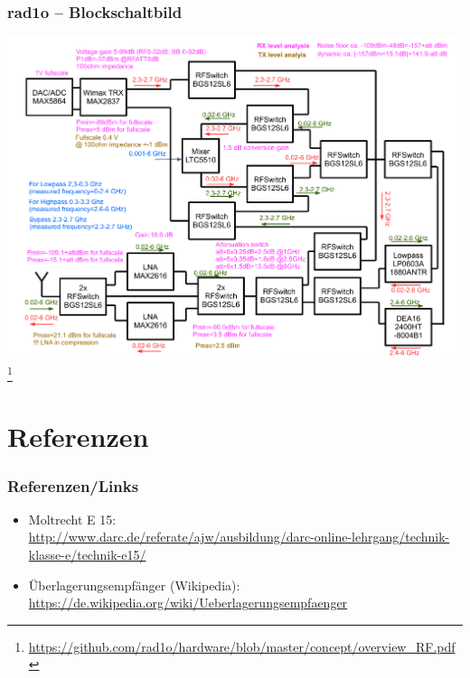 \begin{frame}
  \frametitle{rad1o -- Blockschaltbild}
  \begin{center}
    \includegraphics[width=1\textwidth,height=.8\textheight,keepaspectratio]{e15/rad1o_block.pdf}
    \footnote{\tiny \url{https://github.com/rad1o/hardware/blob/master/concept/overview_RF.pdf}}
  \end{center}
\end{frame}

\section*{Referenzen}

\begin{frame}
    \frametitle{Referenzen/Links}
    
    \footnotesize
    \begin{itemize}
        \item Moltrecht E 15: \\
              \url{http://www.darc.de/referate/ajw/ausbildung/darc-online-lehrgang/technik-klasse-e/technik-e15/}
        \item Überlagerungsempfänger (Wikipedia): \\
              \url{https://de.wikipedia.org/wiki/Ueberlagerungsempfaenger}
    \end{itemize}

\end{frame}


